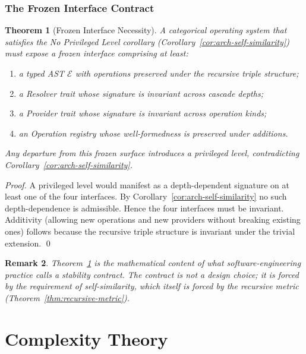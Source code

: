 \documentclass[twocolumn,a4paper]{article}
\newtheorem{theorem}{Theorem}[section]
\newtheorem{remark}[theorem]{Remark}
\newcommand{\Expr}{\mathcal{E}}
\begin{document}
\section{The Frozen Interface Contract}
\label{sec:frozen-interface}

\begin{theorem}[Frozen Interface Necessity]
\label{thm:frozen-interface}
A categorical operating system that satisfies the No Privileged Level corollary (Corollary~\ref{cor:arch-self-similarity}) must expose a frozen interface comprising at least:
\begin{enumerate}[nosep,label=(\arabic*)]
\item a typed AST $\Expr$ with operations preserved under the recursive triple structure;
\item a Resolver trait whose signature is invariant across cascade depths;
\item a Provider trait whose signature is invariant across operation kinds;
\item an Operation registry whose well-formedness is preserved under additions.
\end{enumerate}
Any departure from this frozen surface introduces a privileged level, contradicting Corollary~\ref{cor:arch-self-similarity}.
\end{theorem}

\begin{proof}
A privileged level would manifest as a depth-dependent signature on at least one of the four interfaces. By Corollary~\ref{cor:arch-self-similarity} no such depth-dependence is admissible. Hence the four interfaces must be invariant. Additivity (allowing new operations and new providers without breaking existing ones) follows because the recursive triple structure is invariant under the trivial extension. \qed
\end{proof}

\begin{remark}
Theorem~\ref{thm:frozen-interface} is the mathematical content of what software-engineering practice calls a stability contract. The contract is not a design choice; it is forced by the requirement of self-similarity, which itself is forced by the recursive metric (Theorem~\ref{thm:recursive-metric}).
\end{remark}

\part{Complexity Theory}
\end{document}
